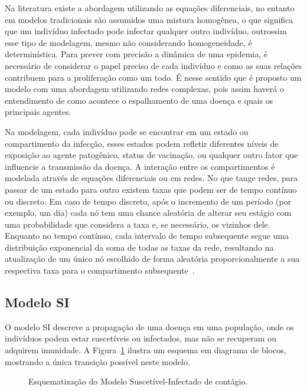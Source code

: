 Na literatura existe a abordagem utilizando as equações diferenciais, no entanto em modelos tradicionais são assumidos uma mistura homogênea, o que significa que um indivíduo infectado pode infectar qualquer outro indivíduo, outrossim esse tipo de modelagem, mesmo não considerando homogeneidade, é determinística. Para prever com precisão a dinâmica de uma epidemia, é necessário de considerar o papel preciso de cada indivíduo e como as suas relações contribuem para a proliferação como um todo. É nesse sentido que é proposto um modelo com uma abordagem utilizando redes complexas, pois assim haverá o entendimento de como acontece o espalhamento de uma doença e quais os principais agentes.

Na modelagem, cada indivíduo pode se encontrar em um estado ou compartimento da infecção, esses estados podem 
refletir 
diferentes níveis de exposição ao agente patogênico, status de vacinação, ou qualquer outro fator que influencie a transmissão da doença. A interação entre os compartimentos é modelada através de equações diferenciais ou em redes. No que tange redes, para passar de um estado para outro existem taxas que podem ser de tempo contínuo ou discreto. Em caso de tempo discreto, após o incremento de um 
período (por exemplo, um dia) 
cada nó tem uma chance aleatória de alterar seu estágio com uma probabilidade que considera a taxa e, se necessário, os vizinhos dele. Enquanto no tempo contínuo, cada intervalo de tempo subsequente segue uma distribuição exponencial da soma de todas as taxas da rede, resultando na atualização de um único nó escolhido de forma aleatória 
proporcionalmente
a sua respectiva taxa para o compartimento subsequente~\cite{Gillespie1976}.

\subsection{Modelo SI}

O modelo SI descreve a propagação de uma doença em uma população, onde os indivíduos podem estar suscetíveis ou infectados, mas não se recuperam ou adquirem imunidade. A Figura~\ref{img:SI} ilustra um esquema em diagrama de blocos, mostrando a única transição possível neste modelo. 

\begin{figure}[ht]
  \centering
  \captionsetup{font=normalsize,skip=0.8pt,singlelinecheck=on,labelsep=endash}
  \caption{Esquematização do Modelo Suscetível-Infectado de contágio.}
  \label{img:SI}
\end{figure}

